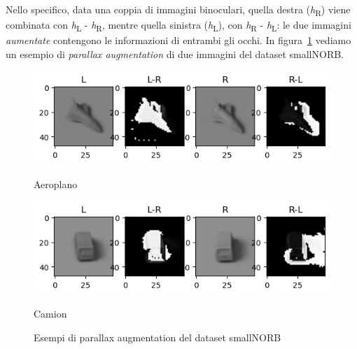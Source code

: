\documentclass[italian,12pt,a4paper,oneside,final]{report}
\begin{document}
Nello specifico, data una coppia di immagini binoculari, quella destra (\textit{h}\textsubscript{R}) viene combinata con \textit{h}\textsubscript{L} - \textit{h}\textsubscript{R}, mentre quella sinistra (\textit{h}\textsubscript{L}), con \textit{h}\textsubscript{R} - \textit{h}\textsubscript{L}: le due immagini \textit{aumentate} contengono le informazioni di entrambi gli occhi.
In figura~\ref{fig:smallnorb_augment_samples} vediamo un esempio di  \textit{parallax augmentation} di due immagini del dataset smallNORB.

\begin{figure}[ht]
		\centering
		\begin{subcaptionblock}{0.7\textwidth}
			\centering
			\includegraphics[width=1\linewidth]{smallnorb_augment_airplane.png}
			\caption{Aeroplano}
			\label{fig:smallnorb_augment_airplane}
		\end{subcaptionblock}%
		\hfill
		\begin{subcaptionblock}{0.7\textwidth}
			\centering
			\includegraphics[width=1\linewidth]{smallnorb_augment_truck.png}
			\caption{Camion}
			\label{fig:smallnorb_augment_truck}
		\end{subcaptionblock}%
	\caption{Esempi di parallax augmentation del dataset smallNORB}
	\label{fig:smallnorb_augment_samples}
\end{figure}
\end{document}
